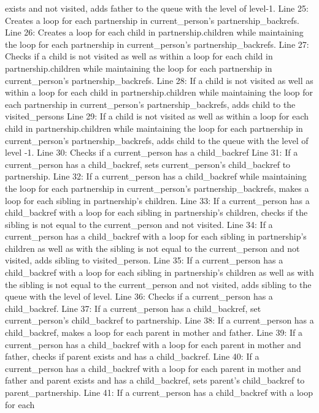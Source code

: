 \documentclass[
]{article}
\begin{document}
exists and not visited, adds father to the queue with the level of
level-1. Line 25: Creates a loop for each partnership in current\_person's
partnership\_backrefs. Line 26: Creates a loop for each child in partnership.children while
maintaining the loop for each partnership in current\_person's
partnership\_backrefs. Line 27: Checks if a child is not visited as well as within a loop for
each child in partnership.children while maintaining the loop for each
partnership in current\_person's partnership\_backrefs. Line 28: If a child is not visited as well as within a loop for each
child in partnership.children while maintaining the loop for each
partnership in current\_person's partnership\_backrefs, adds child to
the visited\_persons Line 29: If a child is not visited as well as within a loop for each
child in partnership.children while maintaining the loop for each
partnership in current\_person's partnership\_backrefs, adds child to
the queue with the level of level -1. Line 30: Checks if a current\_person has a child\_backref Line 31: If a current\_person has a child\_backref, sets
current\_person's child\_backref to partnership. Line 32: If a current\_person has a child\_backref while maintaining the
loop for each partnership in current\_person's partnership\_backrefs,
makes a loop for each sibling in partnership's children. Line 33: If a current\_person has a child\_backref with a loop for each
sibling in partnership's children, checks if the sibling is not equal to
the current\_person and not visited. Line 34: If a current\_person has a child\_backref with a loop for each
sibling in partnership's children as well as with the sibling is not
equal to the current\_person and not visited, adds sibling to
visited\_person. Line 35: If a current\_person has a child\_backref with a loop for each
sibling in partnership's children as well as with the sibling is not
equal to the current\_person and not visited, adds sibling to the queue
with the level of level. Line 36: Checks if a current\_person has a child\_backref. Line 37: If a current\_person has a child\_backref, set
current\_person's child\_backref to partnership. Line 38: If a current\_person has a child\_backref, makes a loop for
each parent in mother and father. Line 39: If a current\_person has a child\_backref with a loop for each
parent in mother and father, checks if parent exists and has a
child\_backref. Line 40: If a current\_person has a child\_backref with a loop for each
parent in mother and father and parent exists and has a child\_backref,
sets parent's child\_backref to parent\_partnership. Line 41: If a current\_person has a child\_backref with a loop for each
\end{document}
